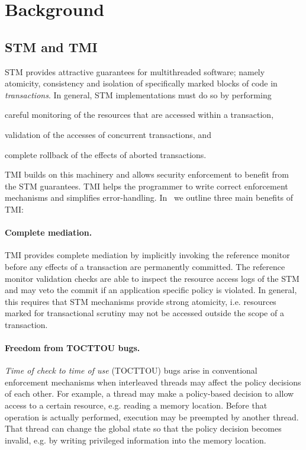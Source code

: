 \section{Background} %
\label{sec:background}

\subsection{STM and TMI} %
\label{sub:stm_and_tmi}

STM provides attractive guarantees for multithreaded software; namely atomicity,
consistency and isolation of specifically marked blocks of code in {\em transactions}.
In general, STM implementations must do so by performing

\begin{mybullet}
    \item careful monitoring of the resources that are accessed within a transaction,
    \item validation of the accesses of concurrent transactions, and
    \item complete rollback of the effects of aborted transactions.
\end{mybullet}

TMI builds on this machinery and allows security enforcement to benefit from
the STM guarantees. TMI helps the programmer to write correct enforcement mechanisms
and simplifies error-handling. In~\cite{tmi} we outline three main benefits of TMI:

\paragraph{Complete mediation.} TMI provides complete mediation by implicitly invoking
the reference monitor before any effects of a transaction are permanently committed. The
reference monitor validation checks
are able to inspect the resource access logs of the STM and may veto the
commit if an application specific policy is violated. 
In general, this requires that STM mechanisms provide
strong atomicity, i.e. resources marked for transactional scrutiny may not be accessed outside
the scope of a transaction.

\paragraph{Freedom from TOCTTOU bugs.} {\em Time of check to time of use} (TOCTTOU) bugs arise
in conventional enforcement mechanisms when interleaved threads may affect the policy decisions
of each other. For example, a thread may make a policy-based decision to allow access to a
certain resource, e.g. reading a memory location. Before that operation is actually performed, 
execution may be preempted by another thread. That thread can change the global state so that the 
policy decision becomes invalid,
e.g. by writing privileged information into the memory location.

